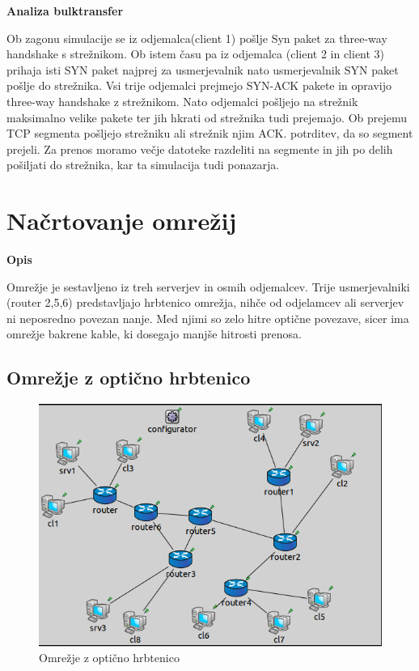 \documentclass[a4paper,11pt]{article}
\begin{document}
\setlength{\parindent}{0pt}
\large\bf Analiza bulktransfer\par
\setlength{\parindent}{10pt}
\normalfont \normalsize
Ob zagonu simulacije se iz odjemalca(client 1) pošlje Syn paket za three-way handshake s strežnikom. Ob istem času pa iz odjemalca (client 2 in client 3) prihaja isti SYN paket najprej za usmerjevalnik nato usmerjevalnik SYN paket pošlje do strežnika. Vsi trije odjemalci prejmejo SYN-ACK pakete in opravijo three-way handshake z strežnikom. Nato odjemalci pošljejo na strežnik maksimalno velike pakete ter jih hkrati od strežnika tudi prejemajo. Ob prejemu TCP segmenta pošljejo strežniku ali strežnik njim ACK. potrditev, da so segment prejeli. Za prenos moramo večje datoteke razdeliti na segmente in jih po delih pošiljati do strežnika, kar ta simulacija tudi ponazarja.

\pagebreak

\section{Načrtovanje omrežij}\par
\large \bf Opis \par
\normalfont \normalsize
Omrežje je sestavljeno iz treh serverjev in osmih odjemalcev. Trije usmerjevalniki (router 2,5,6) predstavljajo hrbtenico omrežja, nihče od odjelamcev ali serverjev ni neposredno povezan nanje. Med njimi so zelo hitre optične povezave, sicer ima omrežje bakrene kable, ki dosegajo manjše hitrosti prenosa. 
\subsection{Omrežje z optično hrbtenico}

\begin{figure}[h]
	\centering
	\includegraphics[width=\textwidth]{omrHrbtenica.png}
	\caption{Omrežje z optično hrbtenico}
	\label{bulkTransfer}	
\end{figure}
\end{document}
